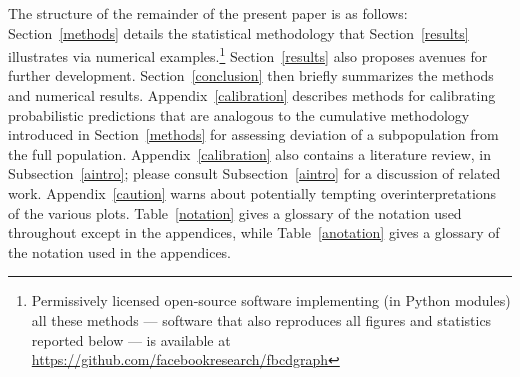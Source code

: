 \documentclass{article}
\begin{document}
The structure of the remainder of the present paper is as follows:
Section~\ref{methods} details the statistical methodology that
Section~\ref{results} illustrates
via numerical examples.\footnote{Permissively licensed open-source software
implementing (in Python modules) all these methods --- software that also
reproduces all figures and statistics reported below --- is available at
\url{https://github.com/facebookresearch/fbcdgraph}}
Section~\ref{results} also proposes avenues for further development.
Section~\ref{conclusion} then briefly summarizes the methods
and numerical results. Appendix~\ref{calibration} describes methods
for calibrating probabilistic predictions that are analogous
to the cumulative methodology introduced in Section~\ref{methods}
for assessing deviation of a subpopulation from the full population.
Appendix~\ref{calibration} also contains a literature review,
in Subsection~\ref{aintro}; please consult Subsection~\ref{aintro}
for a discussion of related work.
Appendix~\ref{caution} warns about potentially tempting overinterpretations
of the various plots.
Table~\ref{notation} gives a glossary of the notation used throughout
except in the appendices, while Table~\ref{anotation} gives a glossary
of the notation used in the appendices.



\newlength{\vertsep}
\setlength{\vertsep}{.1in}
\newlength{\imsize}
\setlength{\imsize}{.465\textwidth}
\end{document}
